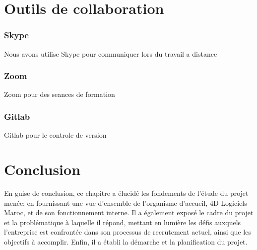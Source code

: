 \section{Outils de collaboration}
\subsubsection{Skype}
Nous avons utilise Skype pour communiquer lors du travail a distance 
\subsubsection{Zoom}
Zoom pour des seances de formation
\subsubsection{Gitlab}
Gitlab pour le controle de version
\subsection{}

\section{Conclusion}
En guise de conclusion, ce chapitre a élucidé les fondements de l’étude du projet
menée; en fournissant une vue d’ensemble de l’organisme d’accueil, 4D Logiciels Maroc,
et de son fonctionnement interne. Il a également exposé le cadre du projet et la problématique à laquelle
il répond, mettant en lumière les défis auxquels l’entreprise est confrontée dans son
processus de recrutement actuel, ainsi que les objectifs à accomplir. Enfin, il a établi la
démarche et la planification du projet.


